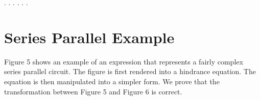 \documentclass[11pt,twocolumn]{article}
\begin{document}
\begin{coqdoccode}
\coqdocindent{3.00em}
    .\coqdoceol
\coqdocnoindent
{}.\coqdoceol
\coqdocindent{1.00em}
 .\coqdoceol
\coqdocindent{1.00em}
 .\coqdoceol
\coqdocindent{1.00em}
 .\coqdoceol
\coqdocnoindent
{}.\coqdoceol
\coqdocemptyline
\end{coqdoccode}
\section{Series Parallel Example}




Figure 5 shows an example of an expression that represents a fairly
complex series parallel circuit.  The figure is first rendered into a
hindrance equation.  The equation is then manipulated into a simpler
form.  We prove that the transformation between Figure 5 and Figure 6
is correct.
\end{document}
